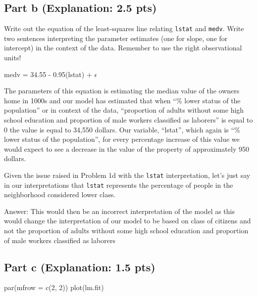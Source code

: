 \documentclass[
]{article}
\newenvironment{Shaded}{\begin{snugshade}}{\end{snugshade}}
\newcommand{\AttributeTok}[1]{\textcolor[rgb]{0.77,0.63,0.00}{#1}}
\newcommand{\DecValTok}[1]{\textcolor[rgb]{0.00,0.00,0.81}{#1}}
\newcommand{\FunctionTok}[1]{\textcolor[rgb]{0.00,0.00,0.00}{#1}}
\newcommand{\NormalTok}[1]{#1}
\begin{document}
\hypertarget{part-b-explanation-2.5-pts}{%
\subsection{Part b (Explanation: 2.5
pts)}\label{part-b-explanation-2.5-pts}}

Write out the equation of the least-squares line relating \texttt{lstat}
and \texttt{medv}. Write two sentences interpreting the parameter
estimates (one for slope, one for intercept) in the context of the data.
Remember to use the right observational units!

medv = 34.55 - 0.95(lstat) + \(\epsilon\)

The parameters of this equation is estimating the median value of the
owners home in 1000s and our model has estimated that when ``\% lower
status of the population'' or in context of the data, ``proportion of
adults without some high school education and proportion of male workers
classified as laborers'' is equal to 0 the value is equal to 34,550
dollars. Our variable, ``lstat'', which again is ``\% lower status of
the population'', for every percentage increase of this value we would
expect to see a decrease in the value of the property of approximately
950 dollars.

Given the issue raised in Problem 1d with the \texttt{lstat}
interpretation, let's just say in our interpretations that
\texttt{lstat} represents the percentage of people in the neighborhood
considered lower class.

Answer: This would then be an incorrect interpretation of the model as
this would change the interpretation of our model to be based on class
of citizens and not the proportion of adults without some high school
education and proportion of male workers classified as laborers

\hypertarget{part-c-explanation-1.5-pts}{%
\subsection{Part c (Explanation: 1.5
pts)}\label{part-c-explanation-1.5-pts}}

\begin{Shaded}
\begin{Highlighting}[]
\FunctionTok{par}\NormalTok{(}\AttributeTok{mfrow =} \FunctionTok{c}\NormalTok{(}\DecValTok{2}\NormalTok{, }\DecValTok{2}\NormalTok{))}
\FunctionTok{plot}\NormalTok{(lm.fit)}
\end{Highlighting}
\end{Shaded}
\end{document}
